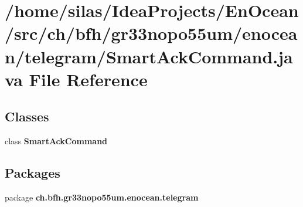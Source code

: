 \section{/home/silas/\+Idea\+Projects/\+En\+Ocean/src/ch/bfh/gr33nopo55um/enocean/telegram/\+Smart\+Ack\+Command.java File Reference}
\label{SmartAckCommand_8java}
\subsection*{Classes}
\begin{DoxyCompactItemize}
\item 
class {\bf Smart\+Ack\+Command}
\end{DoxyCompactItemize}
\subsection*{Packages}
\begin{DoxyCompactItemize}
\item 
package {\bf ch.\+bfh.\+gr33nopo55um.\+enocean.\+telegram}
\end{DoxyCompactItemize}
